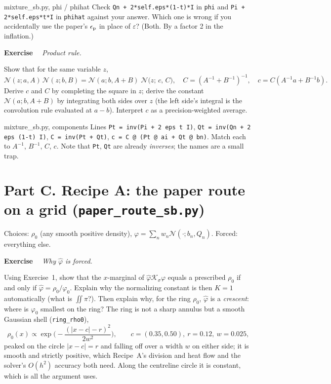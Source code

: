 \documentclass[11pt]{article}
\newcommand{\eps}{\varepsilon}
\newcommand{\code}[1]{\texttt{#1}}
\newcommand{\Nc}{\mathcal{N}}
\newcommand{\Kc}{\mathcal{K}}
\newcommand{\hphi}{\hat\varphi}
\newcounter{ex}
\newenvironment{ex}[1]{\refstepcounter{ex}\par\medskip\noindent\textbf{Exercise \theex}\ \ \textit{#1}\par\nopagebreak\smallskip}{\par\medskip}
\begin{document}
\begin{codebox}{mixture\_sb.py, phi / phihat}
Check \code{Qn + 2*self.eps*(1-t)*I} in \code{phi} and \code{Pi + 2*self.eps*t*I} in
\code{phihat} against your answer. Which one is wrong if you accidentally use the paper's
$\epsilon_{\rm p}$ in place of $\eps$? (Both. By a factor 2 in the inflation.)
\end{codebox}

\begin{ex}{Product rule.}
Show that for the same variable $z$,
\[
  \Nc(z;a,A)\,\Nc(z;b,B)=\Nc(a;b,A+B)\;\Nc\big(z;\,c,\,C\big),\quad
  C=(A^{-1}+B^{-1})^{-1},\quad c=C(A^{-1}a+B^{-1}b).
\]
Derive $c$ and $C$ by completing the square in $z$; derive the constant $\Nc(a;b,A+B)$ by
integrating both sides over $z$ (the left side's integral is the convolution rule evaluated
at $a-b$). Interpret $c$ as a precision-weighted average.
\end{ex}

\begin{codebox}{mixture\_sb.py, components}
Lines \code{Pt = inv(Pi + 2 eps t I)}, \code{Qt = inv(Qn + 2 eps (1-t) I)},
\code{C = inv(Pt + Qt)}, \code{c = C @ (Pt @ ai + Qt @ bn)}. Match each to $A^{-1}$, $B^{-1}$,
$C$, $c$. Note that \code{Pt}, \code{Qt} are already \emph{inverses}; the names are a
small trap.
\end{codebox}

\section*{Part C. Recipe A: the paper route on a grid (\code{paper\_route\_sb.py})}

Choices: $\rho_0$ (any smooth positive density), $\varphi=\sum_nw_n\Nc(\cdot;b_n,Q_n)$.
Forced: everything else.

\begin{ex}{Why $\hphi$ is forced.}
Using Exercise~1, show that the $x$-marginal of $\hphi\Kc_\sigma\varphi$ equals a
prescribed $\rho_0$ if and only if $\hphi=\rho_0/\varphi_0$. Explain why the normalizing
constant is then $K=1$ automatically (what is $\iint\pi$?). Then explain why, for the ring
$\rho_0$, $\hphi$ is a \emph{crescent}: where is $\varphi_0$ smallest on the ring? The ring is
not a sharp annulus but a smooth Gaussian shell (\code{ring\_rho0}),
\[
  \rho_0(x)\propto\exp\!\Big(-\frac{(|x-c|-r)^2}{2w^2}\Big),\qquad c=(0.35,0.50),\ r=0.12,\ w=0.025,
\]
peaked on the circle $|x-c|=r$ and falling off over a width $w$ on either side; it is smooth
and strictly positive, which Recipe~A's division and heat flow and the solver's $O(h^2)$
accuracy both need. Along the centreline circle it is constant, which is all the argument
uses.
\end{ex}
\end{document}
